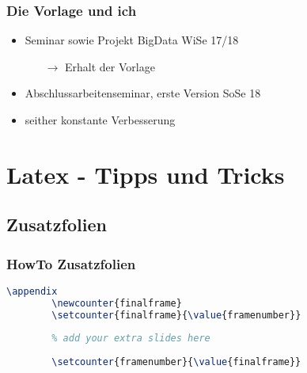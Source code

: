 \begin{frame}
	\frametitle{Die Vorlage und ich}
	
	\begin{itemize}
		\item Seminar sowie Projekt BigData WiSe 17/18
		\begin{itemize}
			\item[$\rightarrow$] Erhalt der Vorlage
		\end{itemize}
		\item Abschlussarbeitenseminar, erste Version SoSe 18
		\item seither konstante Verbesserung
	\end{itemize}
\end{frame}


\section{Latex - Tipps und Tricks}
\subsection{Zusatzfolien}

\begin{frame}[fragile]
	\frametitle{HowTo Zusatzfolien}
	
	\begin{lstlisting}[language = tex]
		\appendix
		\newcounter{finalframe}
		\setcounter{finalframe}{\value{framenumber}}
		
		% add your extra slides here
		
		\setcounter{framenumber}{\value{finalframe}}		
	\end{lstlisting}
\end{frame}



%	
%	



